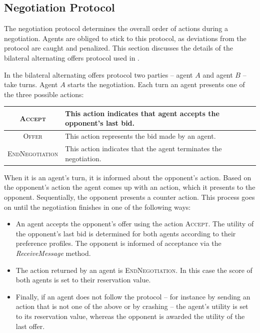 \documentclass[]{article}
\begin{document}
\subsection{Negotiation Protocol}
The negotiation protocol determines the overall order of actions during a negotiation. Agents are obliged to stick to this protocol, as deviations from the protocol are caught and penalized. This section discusses the details of the bilateral alternating offers protocol used in \Genius.

In the bilateral alternating offers protocol two parties -- agent $A$ and agent $B$ -- take turns. Agent $A$ starts the negotiation. Each turn an agent presents one of the three possible actions:

\begin{center}
\begin{tabular}{cm{}}
\hline
\textsc{Accept} & This action indicates that agent accepts the opponent's last bid.\\
\hline
\textsc{Offer} & This action represents the bid made by an agent.\\
\hline
\textsc{EndNegotiation} & This action indicates that the agent terminates the negotiation.\\
\hline
\end{tabular}
\end{center}

When it is an agent's turn, it is informed about the opponent's action. Based on the opponent's action the agent comes up with an action, which it presents to the opponent. Sequentially, the opponent presents a counter action. This process goes on until the negotiation finishes in one of the following ways:
\begin{itemize}
	\item An agent accepts the opponent's offer using the action \textsc{Accept}. The utility of the opponent's last bid is determined for both agents according to their preference profiles. The opponent is informed of acceptance via the \textit{ReceiveMessage} method.
	\item The action returned by an agent is \textsc{EndNegotiation}. In this case the score of both agents is set to their reservation value.
	\item Finally, if an agent does not follow the protocol -- for instance by sending an action that is not one of the above or by crashing -- the agent's utility is set to its reservation value, whereas the opponent is awarded the utility of the last offer.
\end{itemize}
 
\end{document}
